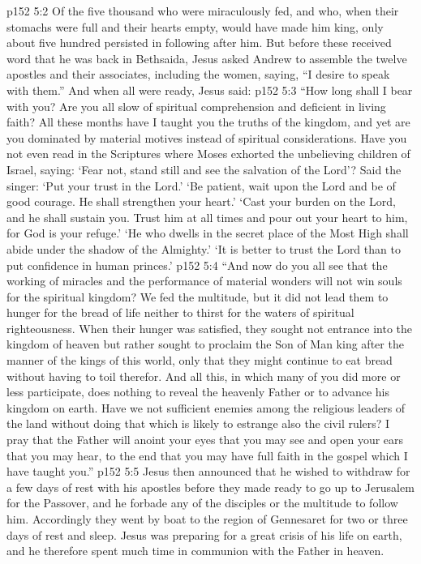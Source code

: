 \pc \vs p152 5:2 Of the five thousand who were miraculously fed, and who, when their stomachs were full and their hearts empty, would have made him king, only about five hundred persisted in following after him. But before these received word that he was back in Bethsaida, Jesus asked Andrew to assemble the twelve apostles and their associates, including the women, saying, \textcolor{ubdarkred}{“I desire to speak with them.”} And when all were ready, Jesus said:
\pc \vs p152 5:3 \textcolor{ubdarkred}{“How long shall I bear with you? Are you all slow of spiritual comprehension and deficient in living faith? All these months have I taught you the truths of the kingdom, and yet are you dominated by material motives instead of spiritual considerations. Have you not even read in the Scriptures where Moses exhorted the unbelieving children of Israel, saying: ‘Fear not, stand still and see the salvation of the Lord’? Said the singer: ‘Put your trust in the Lord.’ ‘Be patient, wait upon the Lord and be of good courage. He shall strengthen your heart.’ ‘Cast your burden on the Lord, and he shall sustain you. Trust him at all times and pour out your heart to him, for God is your refuge.’ ‘He who dwells in the secret place of the Most High shall abide under the shadow of the Almighty.’ ‘It is better to trust the Lord than to put confidence in human princes.’}\plusone
\vs p152 5:4 \textcolor{ubdarkred}{“And now do you all see that the working of miracles and the performance of material wonders will not win souls for the spiritual kingdom? We fed the multitude, but it did not lead them to hunger for the bread of life neither to thirst for the waters of spiritual righteousness. When their hunger was satisfied, they sought not entrance into the kingdom of heaven but rather sought to proclaim the Son of Man king after the manner of the kings of this world, only that they might continue to eat bread without having to toil therefor. And all this, in which many of you did more or less participate, does nothing to reveal the heavenly Father or to advance his kingdom on earth. Have we not sufficient enemies among the religious leaders of the land without doing that which is likely to estrange also the civil rulers? I pray that the Father will anoint your eyes that you may see and open your ears that you may hear, to the end that you may have full faith in the gospel which I have taught you.”}
\pc \vs p152 5:5 Jesus then announced that he wished to withdraw for a few days of rest with his apostles before they made ready to go up to Jerusalem for the Passover, and he forbade any of the disciples or the multitude to follow him. Accordingly they went by boat to the region of Gennesaret for two or three days of rest and sleep. Jesus was preparing for a great crisis of his life on earth, and he therefore spent much time in communion with the Father in heaven.
